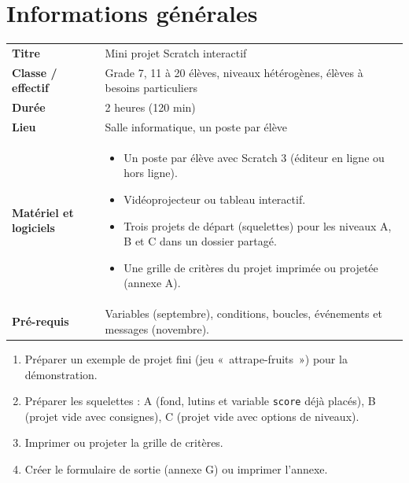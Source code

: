 \documentclass[11pt,a4paper]{article}
\begin{document}

\section{Informations générales}
\begin{tabularx}{\linewidth}{>{\bfseries}p{3.6cm}Y}
\toprule
Titre & Mini projet Scratch interactif\\
Classe / effectif & Grade 7, 11 à 20 élèves, niveaux hétérogènes, élèves à besoins particuliers\\
Durée & 2 heures (120 min)\\
Lieu & Salle informatique, un poste par élève\\
Matériel et logiciels &
\begin{itemize}
 \item Un poste par élève avec Scratch 3 (éditeur en ligne ou hors ligne).
 \item Vidéoprojecteur ou tableau interactif.
 \item Trois projets de départ (squelettes) pour les niveaux A, B et C dans un dossier partagé.
 \item Une grille de critères du projet imprimée ou projetée (annexe A).
\end{itemize}\\
Pré-requis &
Variables (septembre), conditions, boucles, événements et messages (novembre).\\
\bottomrule
\end{tabularx}

\begin{astuce}
\begin{enumerate}
 \item Préparer un exemple de projet fini (jeu «~attrape-fruits~») pour la démonstration.
 \item Préparer les squelettes : A (fond, lutins et variable \texttt{score} déjà placés), B (projet vide avec consignes), C (projet vide avec options de niveaux).
 \item Imprimer ou projeter la grille de critères.
 \item Créer le formulaire de sortie (annexe G) ou imprimer l'annexe.
\end{enumerate}
\end{astuce}

\end{document}
